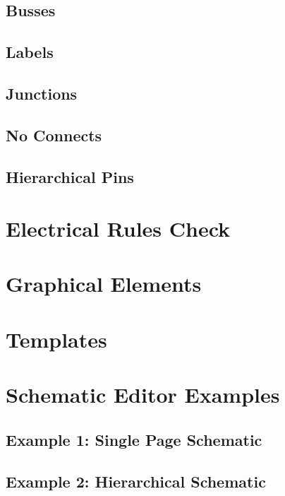 \subsection{Busses}
\subsection{Labels}
\subsection{Junctions}
\subsection{No Connects}
\subsection{Hierarchical Pins}

\section{Electrical Rules Check}

\section{Graphical Elements}

\section{Templates}

\section{Schematic Editor Examples}
\subsection{Example 1: Single Page Schematic}
\subsection{Example 2: Hierarchical Schematic}